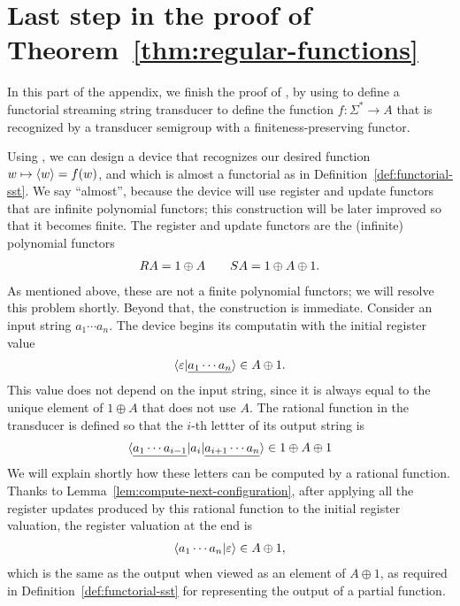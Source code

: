 \section{Last step in the proof of Theorem~\ref{thm:regular-functions}}
In this part of the appendix, we finish the proof of , by using  to define a functorial streaming string transducer to define the function $f : \Sigma^* \to A$ that is recognized by a transducer semigroup with a finiteness-preserving functor. 

Using , we can design a device that  recognizes our desired function $w \mapsto \langle w \rangle=f(w)$, and which is almost a functorial \sst as in Definition~\ref{def:functorial-sst}. We say ``almost'', because the device will use register and update functors that are  infinite polynomial functors; this construction will be later improved so that it becomes finite.  The register and update functors are the (infinite) polynomial functors
\begin{align*}
\functorr A  = 1 \oplus A \qquad \functors A = 1 \oplus A \oplus 1.
\end{align*}
As mentioned above, these are  not a finite polynomial functors; we will resolve this problem shortly.  
Beyond that, the construction is immediate. Consider an input string 
$a_1 \cdots a_n$. The device begins its computatin with the  initial register value 
\begin{align*}
    \langle \varepsilon | \underline{a_1 \cdots a_n} \rangle \in A \oplus 1.
\end{align*}
This value does not depend on the input string, since it is always equal to the unique element of $1 \oplus A$ that does not use $A$. The rational function  in the transducer is defined so that the $i$-th lettter of its output string is 
\begin{align*}
\langle \underline{a_1 \cdots a_{i-1}}|a_i| \underline{a_{i+1} \cdots a_n} \rangle \in 1 \oplus A \oplus 1
\end{align*}
We will explain shortly how these letters  can be computed by a rational function.
Thanks to Lemma~\ref{lem:compute-next-configuration}, after applying all the register updates produced by this rational function to the initial register valuation, the register valuation at the end is 
\begin{align*}
    \langle a_1 \cdots a_n | \varepsilon \rangle \in A \oplus 1,
\end{align*}
which is the same as the output when viewed as an element of $A \oplus 1$, as required in Definition~\ref{def:functorial-sst}  for representing the output of a partial function.

